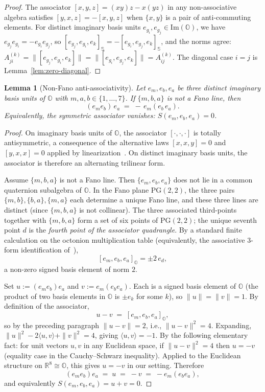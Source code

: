\documentclass[12pt,a4paper]{article}
\newtheorem{lemma}[theorem]{Lemma}
\begin{document}
\begin{proof}
The associator $[x, y, z] = (xy)z - x(yz)$ in any non-associative algebra satisfies $[y, x, z] = -[x, y, z]$ when $\{x, y\}$ is a pair of anti-commuting elements. For distinct imaginary basis units $e_{g_i}, e_{g_j} \in \mathrm{Im}(\mathbb{O})$, we have $e_{g_j} e_{g_i} = -e_{g_i} e_{g_j}$, so $[e_{g_j}, e_{g_i}, e_k]_{\mathbb{S}} = -[e_{g_i}, e_{g_j}, e_k]_{\mathbb{S}}$, and the norms agree: $A^{(k)}_{ji} = \|[e_{g_j}, e_{g_i}, e_k]\| = \|[e_{g_i}, e_{g_j}, e_k]\| = A^{(k)}_{ij}$. The diagonal case $i = j$ is Lemma~\ref{lem:zero-diagonal}.
\end{proof}

\begin{lemma}[Non-Fano anti-associativity]
\label{lem:non-fano-anti-assoc}
Let $e_m, e_b, e_a$ be three distinct imaginary basis units of $\mathbb{O}$ with $m, a, b \in \{1, \ldots, 7\}$. If $\{m, b, a\}$ is not a Fano line, then
\[
  (e_m e_b)\, e_a \;=\; -\,e_m (e_b\, e_a).
\]
Equivalently, the symmetric associator vanishes: $S(e_m, e_b, e_a) = 0$.
\end{lemma}

\begin{proof}
On imaginary basis units of $\mathbb{O}$, the associator $[\cdot, \cdot, \cdot]$ is totally antisymmetric, a consequence of the alternative laws $[x,x,y] = 0$ and $[y,x,x] = 0$ applied by linearization~\cite[\S~1.1]{Baez2002}\cite[Ch.~III]{Schafer1966}. On distinct imaginary basis units, the associator is therefore an alternating trilinear form.

Assume $\{m, b, a\}$ is not a Fano line. Then $\{e_m, e_b, e_a\}$ does not lie in a common quaternion subalgebra of $\mathbb{O}$. In the Fano plane $\mathrm{PG}(2, 2)$, the three pairs $\{m, b\}, \{b, a\}, \{m, a\}$ each determine a unique Fano line, and these three lines are distinct (since $\{m, b, a\}$ is not collinear). The three associated third-points together with $\{m, b, a\}$ form a set of six points of $\mathrm{PG}(2, 2)$; the unique seventh point $d$ is the \emph{fourth point of the associator quadrangle}. By a standard finite calculation on the octonion multiplication table (equivalently, the associative $3$-form identification of~\cite[\S 2.2]{Baez2002}),
\[
[e_m, e_b, e_a]_{\mathbb{O}} = \pm 2 \, e_d,
\]
a non-zero signed basis element of norm $2$.

Set $u := (e_m e_b) e_a$ and $v := e_m (e_b e_a)$. Each is a signed basis element of $\mathbb{O}$ (the product of two basis elements in $\mathbb{O}$ is $\pm e_k$ for some $k$), so $\|u\| = \|v\| = 1$. By definition of the associator,
\[
  u - v \;=\; [e_m, e_b, e_a]_\mathbb{O},
\]
so by the preceding paragraph $\|u - v\| = 2$, i.e., $\|u - v\|^2 = 4$. Expanding, $\|u\|^2 - 2\langle u, v\rangle + \|v\|^2 = 4$, giving $\langle u, v\rangle = -1$. By the following elementary fact: for unit vectors $u, v$ in any Euclidean space, if $\|u - v\|^2 = 4$ then $u = -v$ (equality case in the Cauchy--Schwarz inequality). Applied to the Euclidean structure on $\mathbb{R}^8 \cong \mathbb{O}$, this gives $u = -v$ in our setting. Therefore
\[
  (e_m e_b) e_a \;=\; u \;=\; -v \;=\; -e_m(e_b e_a),
\]
and equivalently $S(e_m, e_b, e_a) = u + v = 0$.
\end{proof}
\end{document}
